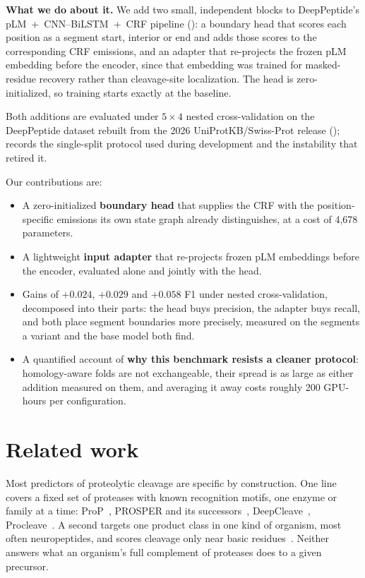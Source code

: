 \documentclass{article}
\begin{document}
\textbf{What we do about it.} We add two small, independent blocks to DeepPeptide's pLM~+~CNN--BiLSTM~+~CRF pipeline (): a boundary head that scores each position as a segment start, interior or end and adds those scores to the corresponding CRF emissions, and an adapter that re-projects the frozen pLM embedding before the encoder, since that embedding was trained for masked-residue recovery rather than cleavage-site localization. The head is zero-initialized, so training starts exactly at the baseline.

Both additions are evaluated under $5\times4$ nested cross-validation on the DeepPeptide dataset rebuilt from the 2026 UniProtKB/Swiss-Prot release ();  records the single-split protocol used during development and the instability that retired it.

Our contributions are:
\begin{itemize}\setlength{\itemsep}{1pt}\setlength{\parskip}{0pt}
  \item A zero-initialized \textbf{boundary head} that supplies the CRF with the position-specific emissions its own state graph already distinguishes, at a cost of 4{,}678 parameters.
  \item A lightweight \textbf{input adapter} that re-projects frozen pLM embeddings before the encoder, evaluated alone and jointly with the head.
  \item Gains of $+0.024$, $+0.029$ and $+0.058$ F1 under nested cross-validation, decomposed into their parts: the head buys precision, the adapter buys recall, and both place segment boundaries more precisely, measured on the segments a variant and the base model both find.
  \item A quantified account of \textbf{why this benchmark resists a cleaner protocol}: homology-aware folds are not exchangeable, their spread is as large as either addition measured on them, and averaging it away costs roughly 200 GPU-hours per configuration.
\end{itemize}


\section{Related work}
\label{sec:related}

Most predictors of proteolytic cleavage are specific by construction. One line covers a fixed set of proteases with known recognition motifs, one enzyme or family at a time: ProP~\citep{duckert2004prop}, PROSPER and its successors~\citep{song2012prosper,li2023prosperousplus}, DeepCleave~\citep{li2020deepcleave}, Procleave~\citep{li2020procleave}. A second targets one product class in one kind of organism, most often neuropeptides, and scores cleavage only near basic residues~\citep{southey2006neuropred,wang2024deepneuropepred}. Neither answers what an organism's full complement of proteases does to a given precursor.
\end{document}
